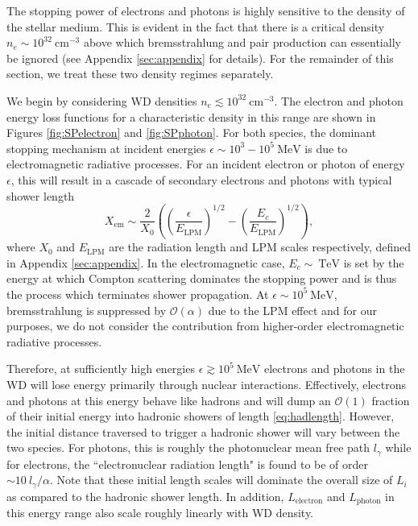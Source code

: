 \documentclass[twocolumn,showpacs,preprintnumbers,amsmath,amssymb,prd]{revtex4}
\newcommand{\OO}{\mathcal{O}}
\def\r{\right)}
\def\l{\left(}
\begin{document}
The stopping power of electrons and photons is highly sensitive to the density of the stellar medium. This is evident in the fact that there is a critical density $n_e \sim 10^{32} ~\text{cm}^{-3}$ above which bremsstrahlung and pair production can essentially be ignored (see Appendix \ref{sec:appendix} for details). For the remainder of this section, we treat these two density regimes separately.

We begin by considering WD densities $n_e \lesssim 10^{32} ~\text{cm}^{-3}$. The electron and photon energy loss functions for a characteristic density in this range are shown in Figures \ref{fig:SPelectron} and \ref{fig:SPphoton}. For both species, the dominant stopping mechanism at incident energies $\epsilon \sim 10^{3}-10^{5} ~\text{MeV}$ is due to electromagnetic radiative processes. For an incident electron or photon of energy $\epsilon$, this will result in a cascade of secondary electrons and photons with typical shower length
\begin{equation}
X_\text{em} \sim \frac{2}{X_0} \l \l \frac{\epsilon}{E_\text{LPM}}\r^{1/2} - \l \frac{E_c}{E_\text{LPM}}\r^{1/2} \r,
\end{equation}
where $X_0$ and $E_\text{LPM}$ are the radiation length and LPM scales respectively, defined in Appendix \ref{sec:appendix}. In the electromagnetic case, $E_c \sim ~\text{TeV}$ is set by the energy at which Compton scattering dominates the stopping power and is thus the process which terminates shower propagation. At $\epsilon \sim 10^{5} ~\text{MeV}$, bremsstrahlung is suppressed by $\OO(\alpha)$ due to the LPM effect and for our purposes, we do not consider the contribution from higher-order electromagnetic radiative processes. 

Therefore, at sufficiently high energies $\epsilon \gtrsim 10^5 ~\text{MeV}$ electrons and photons in the WD will lose energy primarily through nuclear interactions. Effectively, electrons and photons at this energy behave like hadrons and will dump an $\OO(1)$ fraction of their initial energy into hadronic showers of length \eqref{eq:hadlength}. However, the initial distance traversed to trigger a hadronic shower will vary between the two species. For photons, this is roughly the photonuclear mean free path $l_\gamma$ while for electrons, the ``electronuclear radiation length" is found to be of order $\sim 10  ~l_\gamma/\alpha$. Note that these initial length scales will dominate the overall size of $L_i$ as compared to the hadronic shower length. In addition, $L_\text{electron}$ and $L_\text{photon}$ in this energy range also scale roughly linearly with WD density. 
\end{document}
